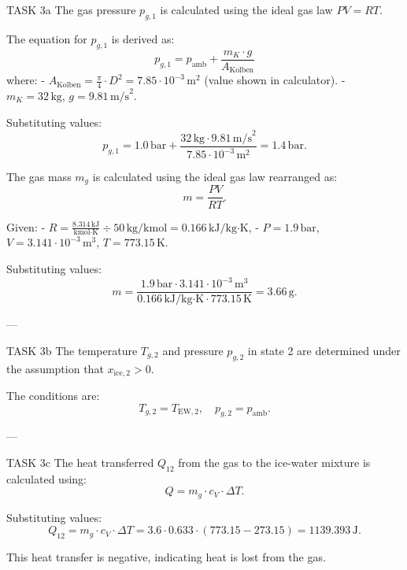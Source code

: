 TASK 3a  
The gas pressure \( p_{g,1} \) is calculated using the ideal gas law \( PV = RT \).  

The equation for \( p_{g,1} \) is derived as:  
\[
p_{g,1} = p_{\text{amb}} + \frac{m_K \cdot g}{A_{\text{Kolben}}
}
\]  
where:  
- \( A_{\text{Kolben}} = \frac{\pi}{4} \cdot D^2 = 7.85 \cdot 10^{-3} \, \text{m}^2 \) (value shown in calculator).  
- \( m_K = 32 \, \text{kg} \), \( g = 9.81 \, \text{m/s}^2 \).  

Substituting values:  
\[
p_{g,1} = 1.0 \, \text{bar} + \frac{32 \, \text{kg} \cdot 9.81 \, \text{m/s}^2}{7.85 \cdot 10^{-3} \, \text{m}^2} = 1.4 \, \text{bar}.
\]  

The gas mass \( m_g \) is calculated using the ideal gas law rearranged as:  
\[
m = \frac{PV}{RT}.
\]  

Given:  
- \( R = \frac{8.314 \, \text{kJ}}{\text{kmol·K}} \div 50 \, \text{kg/kmol} = 0.166 \, \text{kJ/kg·K} \),  
- \( P = 1.9 \, \text{bar} \), \( V = 3.141 \cdot 10^{-3} \, \text{m}^3 \), \( T = 773.15 \, \text{K} \).  

Substituting values:  
\[
m = \frac{1.9 \, \text{bar} \cdot 3.141 \cdot 10^{-3} \, \text{m}^3}{0.166 \, \text{kJ/kg·K} \cdot 773.15 \, \text{K}} = 3.66 \, \text{g}.
\]  

---

TASK 3b  
The temperature \( T_{g,2} \) and pressure \( p_{g,2} \) in state 2 are determined under the assumption that \( x_{\text{ice},2} > 0 \).  

The conditions are:  
\[
T_{g,2} = T_{\text{EW},2}, \quad p_{g,2} = p_{\text{amb}}.
\]  

---

TASK 3c  
The heat transferred \( Q_{12} \) from the gas to the ice-water mixture is calculated using:  
\[
Q = m_g \cdot c_V \cdot \Delta T.
\]  

Substituting values:  
\[
Q_{12} = m_g \cdot c_V \cdot \Delta T = 3.6 \cdot 0.633 \cdot (773.15 - 273.15) = 1139.393 \, \text{J}.
\]  

This heat transfer is negative, indicating heat is lost from the gas.  

